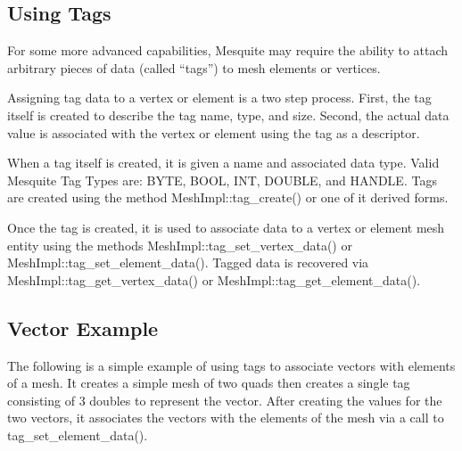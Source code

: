 \subsection{Using Tags}

For some more advanced capabilities, Mesquite may require the ability to attach arbitrary pieces of data (called ``tags'') to mesh elements or vertices.

Assigning tag data to a vertex or element is a two step process.  First, the tag itself is created to describe the tag name, type, and size.  Second, the actual data value is associated with the vertex or element using the tag as a descriptor.

When a tag itself is created, it is given a name and associated data type.  Valid Mesquite Tag Types are: BYTE, BOOL, INT, DOUBLE, and HANDLE. Tags are created using the method MeshImpl::tag\_create() or one of it derived forms.

Once the tag is created, it is used to associate data to a vertex or element mesh entity using the methods MeshImpl::tag\_set\_vertex\_data() or MeshImpl::tag\_set\_element\_data().  Tagged data is recovered via MeshImpl::tag\_get\_vertex\_data() or MeshImpl::tag\_get\_element\_data().


\subsection{Vector Example}

The following is a simple example of using tags to associate vectors with elements of a mesh. It creates a simple mesh of two quads then creates a single tag consisting of 3 doubles to represent the vector. After creating the values for the two vectors, it associates the vectors with the elements of the mesh via a call to tag\_set\_element\_data().


